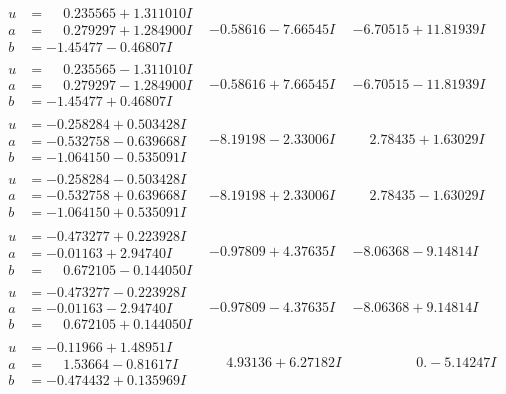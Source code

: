 \documentclass[1p]{elsarticle_modified}
\theoremstyle{definition}
\begin{document}
$$\begin{array}{c|c|c}
\begin{aligned}
u &= \phantom{-}0.235565 + 1.311010 I \\
a &= \phantom{-}0.279297 + 1.284900 I \\
b &= -1.45477 - 0.46807 I\end{aligned}
 & -0.58616 - 7.66545 I & -6.70515 + 11.81939 I \\ \hline\begin{aligned}
u &= \phantom{-}0.235565 - 1.311010 I \\
a &= \phantom{-}0.279297 - 1.284900 I \\
b &= -1.45477 + 0.46807 I\end{aligned}
 & -0.58616 + 7.66545 I & -6.70515 - 11.81939 I \\ \hline\begin{aligned}
u &= -0.258284 + 0.503428 I \\
a &= -0.532758 - 0.639668 I \\
b &= -1.064150 - 0.535091 I\end{aligned}
 & -8.19198 - 2.33006 I & \phantom{-}2.78435 + 1.63029 I \\ \hline\begin{aligned}
u &= -0.258284 - 0.503428 I \\
a &= -0.532758 + 0.639668 I \\
b &= -1.064150 + 0.535091 I\end{aligned}
 & -8.19198 + 2.33006 I & \phantom{-}2.78435 - 1.63029 I \\ \hline\begin{aligned}
u &= -0.473277 + 0.223928 I \\
a &= -0.01163 + 2.94740 I \\
b &= \phantom{-}0.672105 - 0.144050 I\end{aligned}
 & -0.97809 + 4.37635 I & -8.06368 - 9.14814 I \\ \hline\begin{aligned}
u &= -0.473277 - 0.223928 I \\
a &= -0.01163 - 2.94740 I \\
b &= \phantom{-}0.672105 + 0.144050 I\end{aligned}
 & -0.97809 - 4.37635 I & -8.06368 + 9.14814 I \\ \hline\begin{aligned}
u &= -0.11966 + 1.48951 I \\
a &= \phantom{-}1.53664 - 0.81617 I \\
b &= -0.474432 + 0.135969 I\end{aligned}
 & \phantom{-}4.93136 + 6.27182 I & \phantom{-0.000000 } 0. - 5.14247 I \\ \hline\begin{aligned}

\end{aligned}
\end{array}$$
\end{document}
